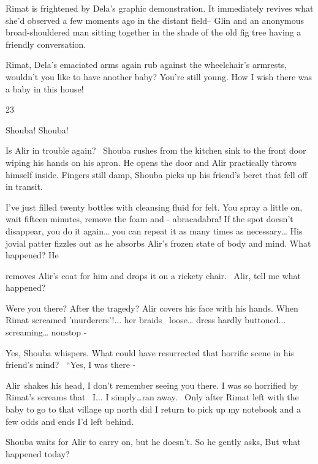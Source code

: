 \documentclass[letterpaper]{article}
\begin{document}
Rimat is frightened by Dela's graphic demonstration. It immediately revives what she'd observed a few moments ago in the
distant field-- Glin and an anonymous broad-shouldered man sitting together in the shade of the old fig tree having a
friendly conversation.

{\textquotedbl}Rimat,{\textquotedbl} Dela's emaciated arms again rub against the wheelchair's armrests,
{\textquotedbl}wouldn't you like to have another baby? You're still young. How I wish there was a baby in this
house!{\textquotedbl}


\bigskip

23~

{\textquotedbl}Shouba! Shouba!{\textquotedbl}

Is Alir in trouble again?~ Shouba rushes from the kitchen sink to the front door wiping his hands on his apron. He opens
the door and Alir practically throws himself inside. Fingers still damp, Shouba picks up his friend's beret that fell
off in transit. 

{\textquotedbl}I've just filled twenty bottles with cleansing fluid for felt. You spray a little on, wait fifteen
minutes, remove the foam and - abracadabra! If the spot doesn't disappear, you do it again{\dots} you can repeat it as
many times as necessary{\dots}{\textquotedbl} His jovial patter fizzles out as he absorbs Alir's frozen state of body
and mind. {\textquotedbl}What happened?{\textquotedbl} He

removes Alir's coat for him and drops it on a rickety chair. \ {\textquotedbl}Alir, tell me what
happened?{\textquotedbl} 

{\textquotedbl}Were you there? After the tragedy?{\textquotedbl} Alir covers his face with his hands.
{\textquotedbl}When Rimat screamed 'murderers'!... her braids \ loose{\dots} dress hardly buttoned... screaming{\dots}
nonstop -{\textquotedbl}

{\textquotedbl}Yes,{\textquotedbl} Shouba whispers. What could have resurrected that horrific scene in his friend's
mind? \ {}``Yes, I was there -{\textquotedbl}

Alir~shakes his head, {\textquotedbl}I don't remember seeing you there.\textcolor{red}{ }I was so horrified by Rimat's
screams that \ I... I simply{\dots}ran away. \ Only after Rimat left with the baby to go to that village up north did I
return to pick up my notebook and a few odds and ends I'd left behind.{\textquotedbl}

Shouba waits for Alir to carry on, but he doesn't. So he gently asks, {\textquotedbl}But what happened
today?{\textquotedbl} 
\end{document}

